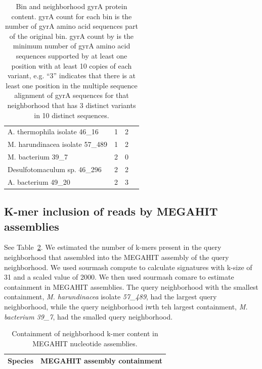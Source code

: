 \begin{table}
{\begin{tabular}{@{}l l c c @{}}
    A. thermophila isolate 46\_16 & 1 & 2 \\
    M. harundinacea isolate 57\_489 & 1 & 2 \\
    M. bacterium 39\_7 & 2 & 0 \\
    Desulfotomaculum sp. 46\_296 & 2 & 2 \\
    A. bacterium 49\_20 & 2 & 3 \\
    \bottomrule
  \end{tabular}
  \caption{  \label{tab:gyrAcounts}%
   Bin and neighborhood gyrA protein content. gyrA count for each bin is the number
    of gyrA amino acid sequences part of the original bin. gyrA count by \plass is
    the minimum number of gyrA amino acid sequences supported by at least one
    position with at least 10 copies of each variant, e.g. ``3'' indicates that
    there is at least one position in the multiple sequence alignment of gyrA
    sequences for that neighborhood that has 3 distinct variants in 10 distinct
    sequences.}
  }
\end{table}

\subsection{K-mer inclusion of reads by MEGAHIT assemblies}
\label{subsec:inclusion}

See Table~\ref{tab:kmer_inclusion}. We estimated the number of k-mers present
in the query neighborhood that assembled into the MEGAHIT assembly of the query 
neighborhood. We used sourmash compute to calculate signatures with k-size of
31 and a scaled value of 2000. We then used sourmash comare to estimate
containment in MEGAHIT assemblies. The query neighborhood with the smallest 
containment, \emph{M. harundinacea} isolate \emph{57\_489}, had the largest query
neighborhood, while the query neighborhood iwth teh largest containment,
\emph{M. bacterium 39\_7}, had the smalled query neighborhood.  

\begin{table}
  \begin{tabular}{l c}
    \toprule
    Species & MEGAHIT assembly containment \\
    \midrule
    
%    
    \bottomrule
  \end{tabular}
  \caption{Containment of neighborhood k-mer content in MEGAHIT nucleotide assemblies.}
  \label{tab:kmer_inclusion}
\end{table}

